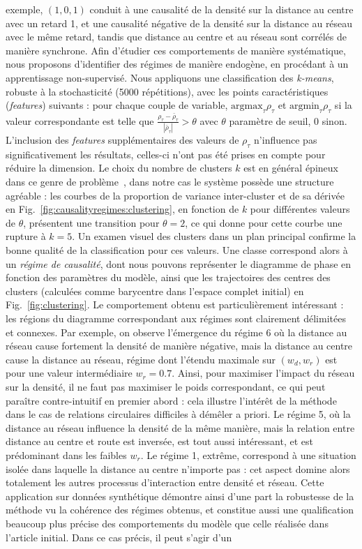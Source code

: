 {exemple, $(1,0,1)$ conduit à une causalité de la densité sur la distance au centre avec un retard 1, et une causalité négative de la densité sur la distance au réseau avec le même retard, tandis que distance au centre et au réseau sont corrélés de manière synchrone. Afin d'étudier ces comportements de manière systématique, nous proposons d'identifier des régimes de manière endogène, en procédant à un apprentissage non-supervisé. Nous appliquons une classification des \emph{k-means}, robuste à la stochasticité (5000 répétitions), avec les points caractéristiques (\emph{features}) suivants : pour chaque couple de variable, $\textrm{argmax}_{\tau} \rho_{\tau}$ et $\textrm{argmin}_{\tau} \rho_{\tau}$ si la valeur correspondante est telle que $\frac{\rho_{\tau}-\bar{\rho}_{\tau}}{\left|\bar{\rho}_{\tau}\right|} > \theta$ avec $\theta$ paramètre de seuil, 0 sinon. L'inclusion des \emph{features} supplémentaires des valeurs de $\rho_{\tau}$ n'influence pas significativement les résultats, celles-ci n'ont pas été prises en compte pour réduire la dimension. Le choix du nombre de clusters $k$ est en général épineux dans ce genre de problème~\cite{hamerly2003learning}, dans notre cas le système possède une structure agréable : les courbes de la proportion de variance inter-cluster et de sa dérivée en Fig.~\ref{fig:causalityregimes:clustering}, en fonction de $k$ pour différentes valeurs de $\theta$, présentent une transition pour $\theta = 2$, ce qui donne pour cette courbe une rupture à $k=5$. Un examen visuel des clusters dans un plan principal confirme la bonne qualité de la classification pour ces valeurs. Une classe correspond alors à un \emph{régime de causalité}, dont nous pouvons représenter le diagramme de phase en fonction des paramètres du modèle, ainsi que les trajectoires des centres des clusters (calculées comme barycentre dans l'espace complet initial) en Fig.~\ref{fig:clustering}. Le comportement obtenu est particulièrement intéressant : les régions du diagramme correspondant aux régimes sont clairement délimitées et connexes. Par exemple, on observe l'émergence du régime 6 où la distance au réseau cause fortement la densité de manière négative, mais la distance au centre cause la distance au réseau, régime dont l'étendu maximale sur $(w_d,w_r)$ est pour une valeur intermédiaire $w_r=0.7$. Ainsi, pour maximiser l'impact du réseau sur la densité, il ne faut pas maximiser le poids correspondant, ce qui peut paraître contre-intuitif en premier abord : cela illustre l'intérêt de la méthode dans le cas de relations circulaires difficiles à démêler a priori. Le régime 5, où la distance au réseau influence la densité de la même manière, mais la relation entre distance au centre et route est inversée, est tout aussi intéressant, et est prédominant dans les faibles $w_r$. Le régime 1, extrême, correspond à une situation isolée dans laquelle la distance au centre n'importe pas : cet aspect domine alors totalement les autres processus d'interaction entre densité et réseau. Cette application sur données synthétique démontre ainsi d'une part la robustesse de la méthode vu la cohérence des régimes obtenus, et constitue aussi une qualification beaucoup plus précise des comportements du modèle que celle réalisée dans l'article initial. Dans ce cas précis, il peut s'agir d'un }
